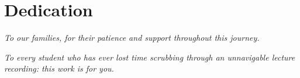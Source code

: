 \section*{Dedication}

\vspace{3cm}
\begin{center}
  \textit{To our families, for their patience and support throughout this journey.}

  \vspace{1cm}
  \textit{To every student who has ever lost time scrubbing through an unnavigable lecture recording: this work is for you.}
\end{center}

\pagebreak
